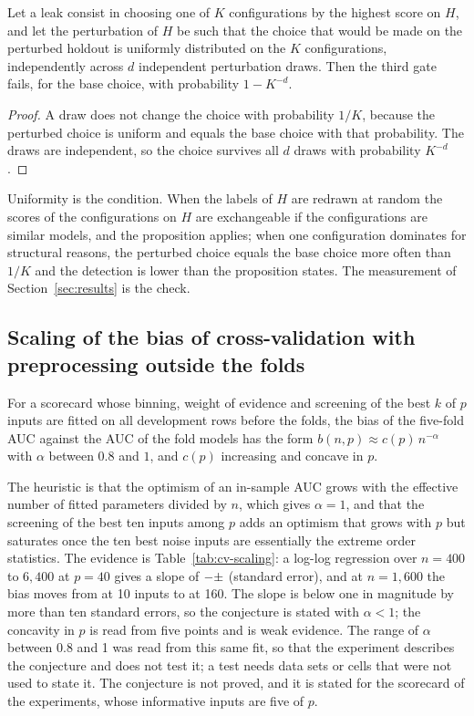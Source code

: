 \begin{proposition}
\label{prop:discrete}
Let a leak consist in choosing one of $K$ configurations by the highest score on $H$, and let the perturbation of $H$ be such that the choice that would be made on the perturbed holdout is uniformly distributed on the $K$ configurations, independently across $d$ independent perturbation draws. Then the third gate fails, for the base choice, with probability $1-K^{-d}$.
\end{proposition}
\begin{proof}
A draw does not change the choice with probability $1/K$, because the perturbed choice is uniform and equals the base choice with that probability. The draws are independent, so the choice survives all $d$ draws with probability $K^{-d}$.
\end{proof}
Uniformity is the condition. When the labels of $H$ are redrawn at random the scores of the configurations on $H$ are exchangeable if the configurations are similar models, and the proposition applies; when one configuration dominates for structural reasons, the perturbed choice equals the base choice more often than $1/K$ and the detection is lower than the proposition states. The measurement of Section~\ref{sec:results} is the check.

\subsection{Scaling of the bias of cross-validation with preprocessing outside the folds}

\begin{conjecture}
\label{conj:cv}
For a scorecard whose binning, weight of evidence and screening of the best $k$ of $p$ inputs are fitted on all development rows before the folds, the bias of the five-fold AUC against the AUC of the fold models has the form $b(n,p)\approx c(p)\,n^{-\alpha}$ with $\alpha$ between $0.8$ and $1$, and $c(p)$ increasing and concave in $p$.
\end{conjecture}
The heuristic is that the optimism of an in-sample AUC grows with the effective number of fitted parameters divided by $n$, which gives $\alpha=1$, and that the screening of the best ten inputs among $p$ adds an optimism that grows with $p$ but saturates once the ten best noise inputs are essentially the extreme order statistics. The evidence is Table~\ref{tab:cv-scaling}: a log-log regression over $n=400$ to $6{,}400$ at $p=40$ gives a slope of $-\nv{e5.exp}\pm\nv{e5.expse}$ (standard error), and at $n=1{,}600$ the bias moves from  at 10 inputs to  at 160. The slope is below one in magnitude by more than ten standard errors, so the conjecture is stated with $\alpha<1$; the concavity in $p$ is read from five points and is weak evidence. The range of $\alpha$ between 0.8 and 1 was read from this same fit, so that the experiment describes the conjecture and does not test it; a test needs data sets or cells that were not used to state it. The conjecture is not proved, and it is stated for the scorecard of the experiments, whose informative inputs are five of $p$.
